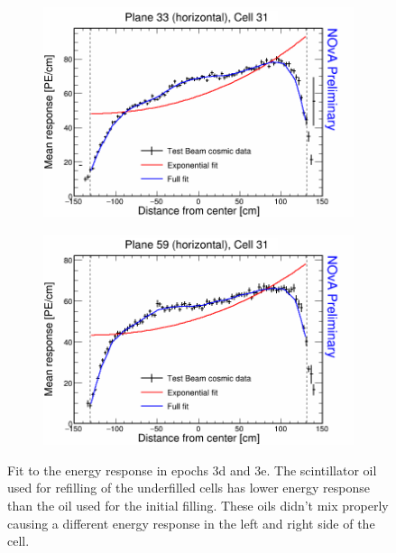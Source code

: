 \begin{figure}[h]
  \begin{subfigure}{0.495\textwidth}
    \includegraphics[width=\linewidth]{Plots/RelativeCalibrationResults/ep3de_033_031.png}
  \end{subfigure}
  \begin{subfigure}{0.495\textwidth}
    \includegraphics[width=\linewidth]{Plots/RelativeCalibrationResults/ep3de_059_031.png}
  \end{subfigure}
  \caption[Attenuation fits for cells with mixed scintillators in period 3 data]{Fit to the energy response in epochs 3d and 3e. The scintillator oil used for refilling of the underfilled cells has lower energy response than the oil used for the initial filling. These oils didn't mix properly causing a different energy response in the left and right side of the cell.}
  \label{fig:AttenfitResultsEpoch3de_RefilledDiscrepancy}
\end{figure}

